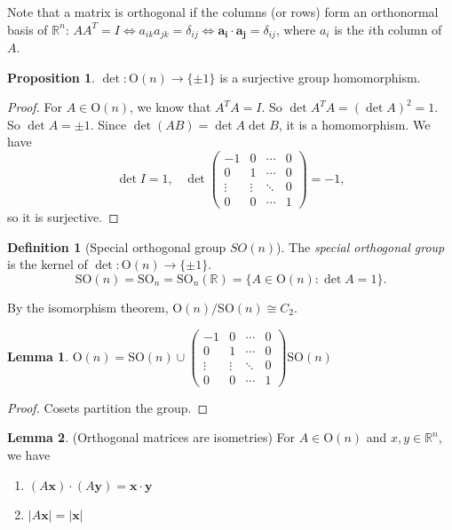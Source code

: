 \documentclass[a4paper]{article}
\theoremstyle{definition}
\newtheorem*{prop}{Proposition}
\newtheorem*{defi}{Definition}
\newtheorem*{lemma}{Lemma}
\newcommand{\mb}[1]{\mathbf{#1}}
\newcommand{\R}{\mathbb{R}}
\newcommand{\Or}{\mathrm{O}}
\newcommand{\SO}{\mathrm{SO}}
\begin{document}
Note that a matrix is orthogonal if the columns (or rows) form an orthonormal basis of $\R^n$: $AA^T = I\Leftrightarrow a_{ik}a_{jk} = \delta_{ij} \Leftrightarrow \mb{a_i}\cdot \mb{a_j} = \delta_{ij}$, where $a_i$ is the $i$th column of $A$.

\begin{prop}
  $\det: \Or(n) \to \{\pm 1\}$ is a surjective group homomorphism. 
\end{prop}

\begin{proof}
  For $A\in \Or(n)$, we know that $A^TA = I$. So $\det A^TA = (\det A)^2  = 1$. So $\det A = \pm 1$. Since $\det(AB) = \det A\det B$, it is a homomorphism. We have
  \[
  \det I = 1,\;\;\;\det 
  \begin{pmatrix}
    -1 & 0 &\cdots & 0\\
    0 & 1 & \cdots & 0\\
    \vdots & \vdots & \ddots & 0\\
    0 & 0 & \cdots & 1
  \end{pmatrix} = -1,
  \]
  so it is surjective.
\end{proof}

\begin{defi}[Special orthogonal group $SO(n)$]
  The \emph{special orthogonal group} is the kernel of $\det: \Or(n) \to \{\pm 1\}$.
  \[
  \SO(n) =\SO_n = \SO_n(\R) = \{A\in \Or(n): \det A = 1\}.
  \]
\end{defi}
By the isomorphism theorem, $\Or(n)/\SO(n) \cong C_2$.

\begin{lemma}
  $\Or(n) = \SO(n) \cup
    \begin{pmatrix}
    -1 & 0 &\cdots & 0\\
    0 & 1 & \cdots & 0\\
    \vdots & \vdots & \ddots & 0\\
    0 & 0 & \cdots &1
  \end{pmatrix}\SO(n)$
\end{lemma}

\begin{proof}
  Cosets partition the group.
\end{proof}

\begin{lemma}
  (Orthogonal matrices are isometries) For $A\in \Or(n)$ and $x, y\in \R^n$, we have
  \begin{enumerate}
  \item $(A\mb{x})\cdot (A\mb{y}) = \mb{x\cdot y}$
  \item $|A\mb{x}| = |\mb{x}|$
  \end{enumerate}
\end{lemma}
\end{document}
